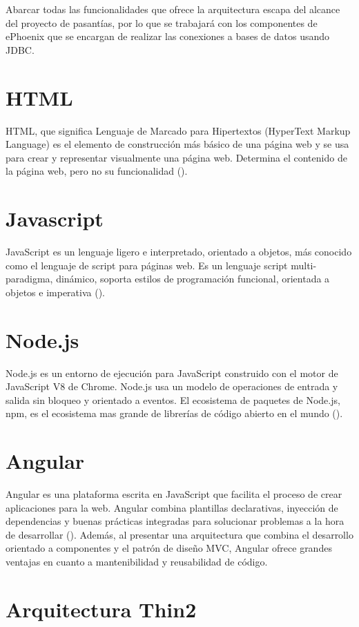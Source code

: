 Abarcar todas las funcionalidades que ofrece la arquitectura escapa del alcance del
proyecto de pasantías, por lo que se trabajará con los componentes de ePhoenix
que se encargan de realizar las conexiones a bases de datos usando JDBC.

\section{HTML}

HTML, que significa Lenguaje de Marcado para Hipertextos (HyperText Markup Language)
es el elemento de construcción más básico de una página web y se usa para crear y
representar visualmente una página web. Determina el contenido de la página web,
pero no su funcionalidad (\cite{HTML}).

\section{Javascript}

JavaScript es un lenguaje ligero e interpretado, orientado a objetos, más conocido
como el lenguaje de script para páginas web. Es un lenguaje script multi-paradigma, dinámico,
soporta estilos de programación funcional, orientada a objetos e imperativa (\cite{JS}).

\section{Node.js}
Node.js es un entorno de ejecución para JavaScript construido con el motor de JavaScript V8
de Chrome. Node.js usa un modelo de operaciones de entrada y salida sin bloqueo y orientado a eventos.
El ecosistema de paquetes de Node.js, npm, es el ecosistema mas grande de librerías
de código abierto en el mundo (\cite{NODE}).

\section{Angular}
Angular es una plataforma escrita en JavaScript que facilita el proceso
de crear aplicaciones para la web. Angular combina plantillas declarativas, inyección de dependencias
y buenas prácticas integradas para solucionar problemas a la hora de desarrollar (\cite{ANGULAR}).
Además, al presentar una arquitectura que combina el desarrollo orientado a componentes
y el patrón de diseño MVC, Angular ofrece grandes ventajas en cuanto a mantenibilidad
y reusabilidad de código.

\section{Arquitectura Thin2}

